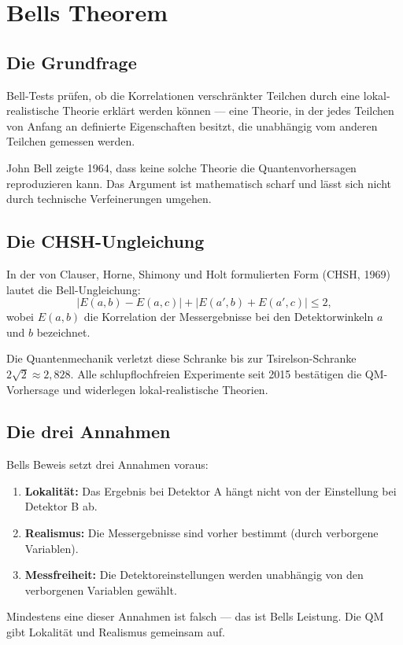 \chapter{Bells Theorem}
\label{ch:bell}

\section{Die Grundfrage}

Bell-Tests prüfen, ob die Korrelationen verschränkter Teilchen durch
eine lokal-realistische Theorie erklärt werden können — eine Theorie,
in der jedes Teilchen von Anfang an definierte Eigenschaften besitzt,
die unabhängig vom anderen Teilchen gemessen werden.

John Bell zeigte 1964, dass keine solche Theorie die
Quantenvorhersagen reproduzieren kann. Das Argument ist
mathematisch scharf und lässt sich nicht durch technische Verfeinerungen
umgehen.

\section{Die CHSH-Ungleichung}

In der von Clauser, Horne, Shimony und Holt formulierten Form
(CHSH, 1969) lautet die Bell-Ungleichung:
\begin{equation}
  |E(a,b)-E(a,c)| + |E(a',b)+E(a',c)| \le 2,
  \label{eq:chsh}
\end{equation}
wobei $E(a,b)$ die Korrelation der Messergebnisse bei den
Detektorwinkeln $a$ und $b$ bezeichnet.

Die Quantenmechanik verletzt diese Schranke bis zur
Tsirelson-Schranke $2\sqrt2\approx2{,}828$. Alle
schlupflochfreien Experimente seit 2015 bestätigen die
QM-Vorhersage und widerlegen lokal-realistische Theorien.

\section{Die drei Annahmen}

Bells Beweis setzt drei Annahmen voraus:
\begin{enumerate}
  \item \textbf{Lokalität:} Das Ergebnis bei Detektor A hängt nicht
        von der Einstellung bei Detektor B ab.
  \item \textbf{Realismus:} Die Messergebnisse sind vorher bestimmt
        (durch verborgene Variablen).
  \item \textbf{Messfreiheit:} Die Detektoreinstellungen werden
        unabhängig von den verborgenen Variablen gewählt.
\end{enumerate}
Mindestens eine dieser Annahmen ist falsch — das ist Bells
Leistung. Die QM gibt Lokalität und Realismus gemeinsam auf.

